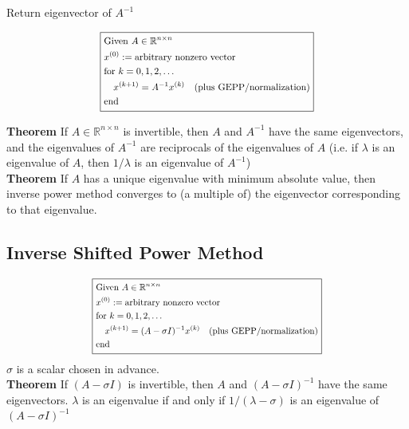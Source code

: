 \documentclass[9pt]{article}
\begin{document}
\begin{multicols}{3}
Return eigenvector of $A^{-1}$ 

\[
\boxed{
\scalebox{0.85}{$
\begin{aligned}
    &\text{Given } A \in \mathbb{R}^{n \times n}\\
    &x^{(0)} := \text{arbitrary nonzero vector}\\
    &\text{for } k = 0, 1, 2, \ldots\\
    & \quad x^{(k+1)} = A^{-1}x^{(k)} \quad \text{(plus GEPP/normalization)}\\
    &\text{end}
\end{aligned}
$}
}
\]

\textbf{Theorem} If $A \in \mathbb{R}^{n \times n}$ is invertible, then $A$ and $A^{-1}$ have the same eigenvectors, and the eigenvalues of $A^{-1}$ are reciprocals of the eigenvalues of $A$ (i.e. if $\lambda$ is an eigenvalue of $A$, then $1/\lambda$ is an eigenvalue of $A^{-1}$)\\

\textbf{Theorem} If $A$ has a unique eigenvalue with minimum absolute value, then inverse power method converges to (a multiple of) the eigenvector corresponding to that eigenvalue.

\hdashrule{\linewidth}{0.5pt}{1mm 1mm}

\vspace{-0.4cm}
\subsection*{Inverse Shifted Power Method}

\[
\boxed{
\scalebox{0.8}{$
\begin{aligned}
    &\text{Given } A \in \mathbb{R}^{n \times n}\\
    &x^{(0)} := \text{arbitrary nonzero vector}\\
    &\text{for } k = 0, 1, 2, \ldots\\
    & \quad x^{(k+1)} = (A - \sigma I)^{-1}x^{(k)} \quad \text{(plus GEPP/normalization)}\\
    &\text{end}
\end{aligned}
$}
}
\]
$\sigma$ is a scalar chosen in advance.\\

\textbf{Theorem} If $(A - \sigma I)$ is invertible, then $A$ and $(A - \sigma I)^{-1}$ have the same eigenvectors. $\lambda$ is an eigenvalue if and only if $1/(\lambda - \sigma)$ is an eigenvalue of $(A - \sigma I)^{-1}$


\end{multicols}
\end{document}
